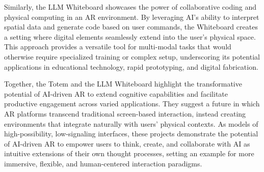 Similarly, the LLM Whiteboard showcases the power of collaborative coding and physical computing in an AR environment.
By leveraging AI’s ability to interpret spatial data and generate code based on user commands, the Whiteboard creates a setting where digital elements seamlessly extend into the user’s physical space.
This approach provides a versatile tool for multi-modal tasks that would otherwise require specialized training or complex setup, underscoring its potential applications in educational technology, rapid prototyping, and digital fabrication.

Together, the Totem and the LLM Whiteboard highlight the transformative potential of AI-driven AR to extend cognitive capabilities and facilitate productive engagement across varied applications.
They suggest a future in which AR platforms transcend traditional screen-based interaction, instead creating environments that integrate naturally with users’ physical contexts.
As models of high-possibility, low-signaling interfaces, these projects demonstrate the potential of AI-driven AR to empower users to think, create, and collaborate with AI as intuitive extensions of their own thought processes, setting an example for more immersive, flexible, and human-centered interaction paradigms.